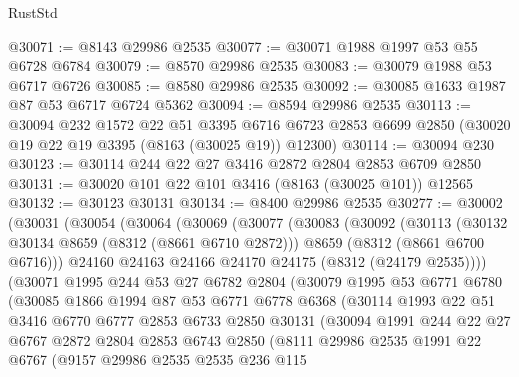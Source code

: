 \begin{lexlean}{RustStd}
\begin{coremodule}
@30071 := @8143 @29986 @2535
@30077 := @30071 @1988 @1997 @53 @55 @6728 @6784
@30079 := @8570 @29986 @2535
@30083 := @30079 @1988 @53 @6717 @6726
@30085 := @8580 @29986 @2535
@30092 := @30085 @1633 @1987 @87 @53 @6717 @6724 @5362
@30094 := @8594 @29986 @2535
@30113 := @30094
    @232
    @1572
    @22
    @51
    @3395
    @6716
    @6723
    @2853
    @6699
    @2850
    (@30020 @19 @22 @19 @3395 (@8163 (@30025 @19)) @12300)
@30114 := @30094 @230
@30123 := @30114 @244 @22 @27 @3416 @2872 @2804 @2853 @6709 @2850
@30131 := @30020 @101 @22 @101 @3416 (@8163 (@30025 @101)) @12565
@30132 := @30123 @30131
@30134 := @8400 @29986 @2535
@30277 := @30002
    (@30031
      (@30054
        (@30064
          (@30069
            (@30077
              (@30083
                (@30092
                  (@30113
                    (@30132 @30134 @8659 (@8312 (@8661 @6710 @2872)))
                    @8659
                    (@8312 (@8661 @6700 @6716)))
                  @24160
                  @24163
                  @24166
                  @24170
                  @24175
                  (@8312 (@24179 @2535))))
              (@30071
                @1995
                @244
                @53
                @27
                @6782
                @2804
                (@30079
                  @1995
                  @53
                  @6771
                  @6780
                  (@30085
                    @1866
                    @1994
                    @87
                    @53
                    @6771
                    @6778
                    @6368
                    (@30114
                      @1993
                      @22
                      @51
                      @3416
                      @6770
                      @6777
                      @2853
                      @6733
                      @2850
                      @30131
                      (@30094
                        @1991
                        @244
                        @22
                        @27
                        @6767
                        @2872
                        @2804
                        @2853
                        @6743
                        @2850
                        (@8111
                          @29986
                          @2535
                          @1991
                          @22
                          @6767
                          (@9157
                            @29986
                            @2535
                            @2535
                            @236
                            @115

\end{coremodule}
\end{lexlean}
